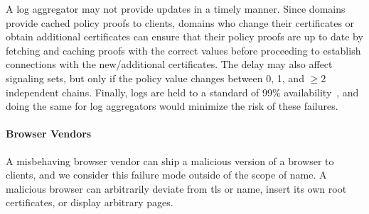 A log aggregator may not provide updates in a timely manner.
Since domains provide cached policy proofs to clients, domains who change their
certificates or obtain additional certificates can ensure that their policy
proofs are up to date by fetching and caching proofs with the correct values
before proceeding to establish connections with the new/additional certificates.
The delay may also affect signaling sets, but only if the policy value changes
between 0, 1, and $\ge 2$ independent chains. Finally, logs are held to a
standard of 99\% availability~\cite{ct-log-policy}, and doing the same for log
aggregators would minimize the risk of these failures.

\paragraph{Browser Vendors}
A misbehaving browser vendor can ship a malicious version of a browser to
clients, and we consider this failure mode outside of the scope of \ac{name}. A
malicious browser can arbitrarily deviate from \ac{tls} or \ac{name}, insert
its own root certificates, or display arbitrary pages. 


